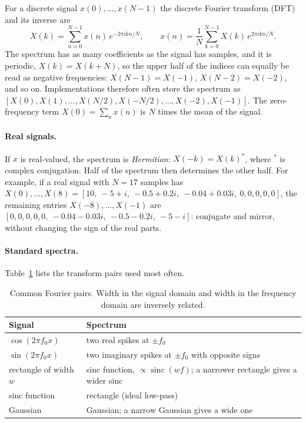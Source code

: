 For a discrete signal $x(0),\dots,x(N-1)$ the discrete Fourier transform (DFT)
and its inverse are
\begin{equation}
  X(k) = \sum_{n=0}^{N-1} x(n)\, e^{-2\pi i kn/N},
  \qquad
  x(n) = \frac{1}{N}\sum_{k=0}^{N-1} X(k)\, e^{2\pi i kn/N}.
\end{equation}
\noindent
The spectrum has as many coefficients as the signal has samples, and it is
periodic, $X(k) = X(k+N)$, so the upper half of the indices can equally be read
as negative frequencies: $X(N-1) = X(-1)$, $X(N-2) = X(-2)$, and so on.
Implementations therefore often store the spectrum as
$[X(0),X(1),\dots,X(N/2),X(-N/2),\dots,X(-2),X(-1)]$. The zero-frequency term
$X(0) = \sum_n x(n)$ is $N$ times the mean of the signal.

\paragraph{Real signals.}
If $x$ is real-valued, the spectrum is \emph{Hermitian}: $X(-k) = X(k)^*$,
where $^*$ is complex conjugation. Half of the spectrum then determines the
other half. For example, if a real signal with $N=17$ samples has
$X(0),\dots,X(8) = [10,\ -5+i,\ -0.5+0.2i,\ -0.04+0.03i,\ 0,0,0,0,0]$, the
remaining entries $X(-8),\dots,X(-1)$ are
$[0,0,0,0,0,\ -0.04-0.03i,\ -0.5-0.2i,\ -5-i]$: conjugate and mirror, without
changing the sign of the real parts.

\paragraph{Standard spectra.}
Table~\ref{tab:fourier-pairs} lists the transform pairs used most often.

\begin{table}[ht]
  \centering
  \begin{tabular}{@{}p{4.2cm}p{8.8cm}@{}}
    \toprule
    Signal & Spectrum \\
    \midrule
    $\cos(2\pi f_0 x)$ & two real spikes at $\pm f_0$ \\
    $\sin(2\pi f_0 x)$ & two imaginary spikes at $\pm f_0$ with opposite signs \\
    rectangle of width $w$ & sinc function, $\propto \operatorname{sinc}(wf)$;
      a narrower rectangle gives a wider sinc \\
    sinc function & rectangle (ideal low-pass) \\
    Gaussian & Gaussian; a narrow Gaussian gives a wide one \\
    \bottomrule
  \end{tabular}
  \caption{Common Fourier pairs. Width in the signal domain and width in the
  frequency domain are inversely related.}
  \label{tab:fourier-pairs}
\end{table}

